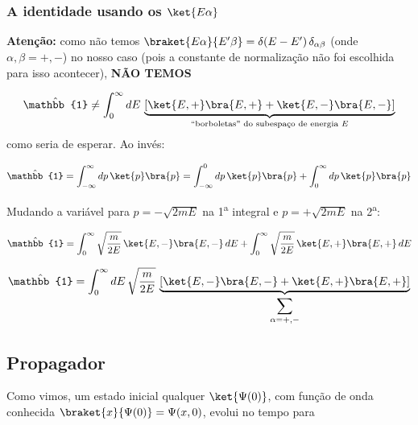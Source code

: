 \subsubsection*{A identidade usando os $\ket{E\alpha}$}

\textbf{Atenção:} como não temos $\braket{E\alpha}{E'\beta} = \delta(E-E')\,\delta_{\alpha\beta}$ (onde $\alpha,\beta = +,-$) no nosso caso (pois a constante de normalização não foi escolhida para isso acontecer), \textbf{NÃO TEMOS}

\begin{equation}
    \hat{\mathbb{1}} \neq \int_0^{\infty} dE\, \underbrace{\left[\ket{E,+}\bra{E,+} + \ket{E,-}\bra{E,-}\right]}_{\text{``borboletas'' do subespaço de energia } E}
\label{eq:aula14_identidade_errada}
\end{equation}
como seria de esperar. Ao invés:

\begin{equation}
    \hat{\mathbb{1}} = \int_{-\infty}^{\infty} dp\, \ket{p}\bra{p} = \int_{-\infty}^{0} dp\, \ket{p}\bra{p} + \int_0^{\infty} dp\, \ket{p}\bra{p}
\label{eq:aula14_identidade_p_split}
\end{equation}

Mudando a variável para $p = -\sqrt{2mE}$ na 1\textsuperscript{a} integral e $p = +\sqrt{2mE}$ na 2\textsuperscript{a}:

\begin{equation}
    \hat{\mathbb{1}} = \int_0^{\infty} \sqrt{\frac{m}{2E}}\,\ket{E,-}\bra{E,-}\, dE + \int_0^{\infty} \sqrt{\frac{m}{2E}}\,\ket{E,+}\bra{E,+}\, dE
\label{eq:aula14_identidade_mudanca_var}
\end{equation}

\begin{equation}
    \hat{\mathbb{1}} = \int_0^{\infty} dE\, \sqrt{\frac{m}{2E}}\, \underbrace{\left[\ket{E,-}\bra{E,-} + \ket{E,+}\bra{E,+}\right]}_{\displaystyle\sum_{\alpha = +,-}}
\label{eq:aula14_identidade_E_final}
\end{equation}


\subsection*{Propagador}

Como vimos, um estado inicial qualquer $\ket{\Psi(0)}$, com função de onda conhecida $\braket{x}{\Psi(0)} = \Psi(x,0)$, evolui no tempo para

